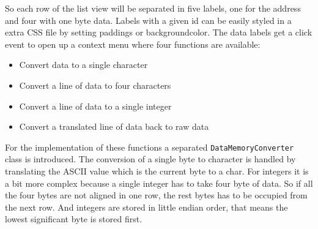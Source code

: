 So each row of the list view will be separated in five labels, one for the address and four with one byte data. Labels with a given id can be easily styled in a extra CSS file by setting paddings or backgroundcolor. The data labels get a click event to open up a context menu where four functions are available:
\begin{itemize}
\item Convert data to a single character
\item Convert a line of data to four characters
\item Convert a line of data to a single integer
\item Convert a translated line of data back to raw data
\end{itemize}
For the implementation of these functions a separated \texttt{DataMemoryConverter} class is introduced. The conversion of a single byte to character is handled by translating the ASCII value which is the current byte to a char. For integers it is a bit more complex because a single integer has to take four byte of data. So if all the four bytes are not aligned in one row, the rest bytes has to be occupied from the next row. And integers are stored in little endian order, that means the lowest significant byte is stored first. 